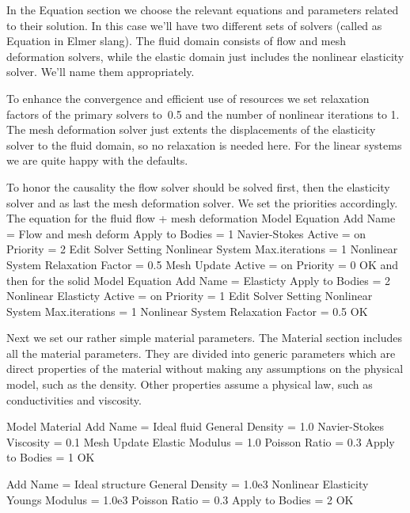 In the Equation section we choose the relevant equations and parameters related to their solution. 
In this case we'll have two different sets of solvers (called as Equation in Elmer slang). 
The fluid domain consists of flow and mesh deformation solvers, while the 
elastic domain just includes the nonlinear elasticity solver. We'll name them appropriately. 

To enhance the convergence and efficient use of resources 
we set relaxation factors of the primary solvers to~0.5 and the 
number of nonlinear iterations to 1. The mesh deformation solver just extents the 
displacements of the elasticity solver to the fluid domain, so no relaxation is needed here. 
For the linear systems we are quite happy with the defaults.

To honor the causality the flow solver should be solved first, then the elasticity solver and
as last the mesh deformation solver. We set the priorities accordingly. 
\\
\noindent
The equation for the fluid flow + mesh deformation
\ttbegin
Model
  Equation
    Add
    Name = Flow and mesh deform
    Apply to Bodies = 1
    Navier-Stokes
      Active = on
      Priority = 2 
      Edit Solver Setting
        Nonlinear System
          Max.iterations = 1
          Nonlinear System Relaxation Factor = 0.5
    Mesh Update
      Active = on
      Priority = 0 
    OK
\ttend        
and then for the solid
\ttbegin
Model
  Equation
    Add
    Name = Elasticty
    Apply to Bodies = 2
    Nonlinear Elasticty
      Active = on
      Priority = 1
      Edit Solver Setting
        Nonlinear System
          Max.iterations = 1
          Nonlinear System Relaxation Factor = 0.5
    OK
\ttend    

Next we set our rather simple material parameters.
The Material section includes all the material parameters.
They are divided into generic parameters which are direct properties of the material
without making any assumptions on the physical model, such as the density. Other properties assume
a physical law, such as conductivities and viscosity. 

\ttbegin
Model
  Material
    Add
    Name = Ideal fluid 
    General 
      Density = 1.0
    Navier-Stokes
      Viscosity = 0.1
    Mesh Update
      Elastic Modulus = 1.0
      Poisson Ratio = 0.3  
    Apply to Bodies = 1 
    OK

    Add  
    Name = Ideal structure
    General 
      Density = 1.0e3
    Nonlinear Elasticity
      Youngs Modulus = 1.0e3
      Poisson Ratio = 0.3
    Apply to Bodies = 2
    OK
\ttend

